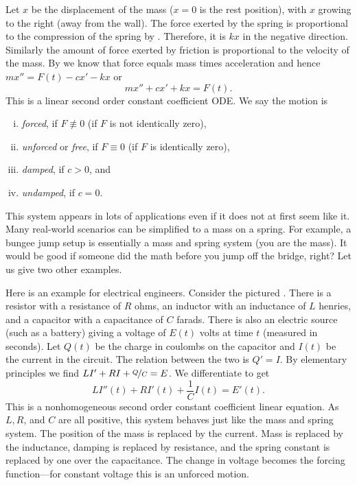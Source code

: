 Let $x$ be the displacement of the mass ($x=0$ is the rest position), with
$x$ growing to the right (away from the wall).
The force exerted by the spring is proportional to the
compression of the spring by .
Therefore, it is $kx$ in the negative direction.
Similarly the amount of force exerted by friction is proportional
to the velocity of the mass.
By  we know that force equals mass times acceleration
and hence $mx'' = F(t)-cx'-kx$ or
\begin{equation*}
mx'' + cx' + kx = F(t) .
\end{equation*}
This is a linear second order constant coefficient ODE\@.
We say the motion is
\begin{enumerate}[(i)]
\item \emph{forced}, if $F \not\equiv 0$ (if $F$ is not identically zero),
\item \emph{unforced} or \emph{free}, if $F \equiv 0$ (if $F$ is identically zero),
\item \emph{damped}, if $c > 0$, and
\item \emph{undamped}, if $c = 0$.
\end{enumerate}

This system appears in lots of applications even if it does not at first
seem like it.  Many real-world scenarios can be simplified to
a mass on a spring.  For example, a bungee jump setup is essentially a mass
and spring system (you are the mass).  It would be good if someone did the math
before you jump off the bridge, right?  Let us give two other examples.

\medskip

\begin{mywrapfigsimp}[5]{1.35in}{1.65in}
\noindent
{}
\end{mywrapfigsimp}
Here is an example for electrical engineers.  Consider the
pictured .
There is a resistor with a resistance of $R$ ohms, an
inductor with an inductance of $L$ henries,
and a capacitor with a capacitance of $C$ farads.  There is also
an electric source (such as a battery) giving a voltage of $E(t)$ volts
at time $t$ (measured in seconds).
Let $Q(t)$ be the charge in coulombs on the capacitor
and $I(t)$ be the current in the circuit.  The relation between the two is
$Q' = I$.  By elementary principles we find 
$L I' + RI + \nicefrac{Q}{C} = E$.   We differentiate to get
\begin{equation*}
L I''(t) + R I'(t) + \frac{1}{C} I(t) = E'(t) .
\end{equation*}
This is a nonhomogeneous second order constant coefficient linear equation.
As $L, R$, and $C$ are all positive, this system behaves just like the
mass and spring system.  The position of the mass is replaced by the current.
Mass is replaced by the inductance, damping is replaced by resistance, and
the spring constant is replaced by one over the capacitance.  The change in
voltage becomes the forcing function---for constant voltage this is an
unforced motion.

